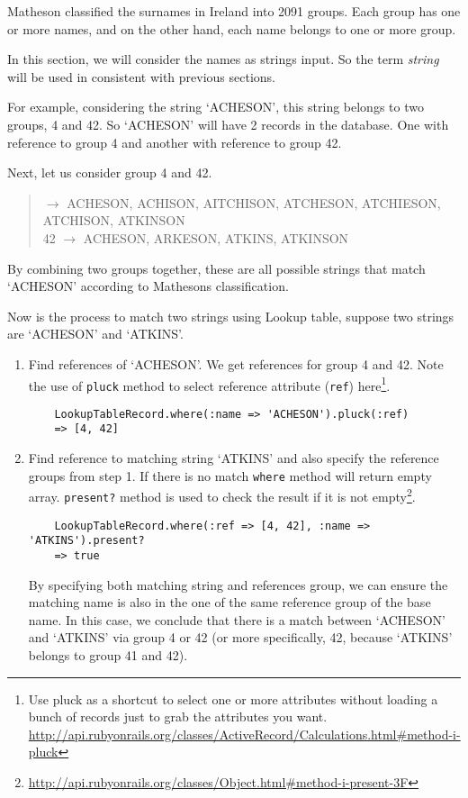 Matheson classified the surnames in Ireland into 2091 groups.
Each group has one or more names, and on the other hand,
each name belongs to one or more group.

In this section, we will consider the names as strings input.
So the term \emph{string} will be used in consistent with
previous sections.

For example, considering the string `ACHESON', this string
belongs to two groups, 4 and 42. So `ACHESON' will have
2 records in the database. One with reference to group 4
and another with reference to group 42.

Next, let us consider group 4 and 42.

\begin{quotation}  $\rightarrow$ ACHESON, ACHISON, AITCHISON, ATCHESON, ATCHIESON, ATCHISON, ATKINSON \\
42 $\rightarrow$ ACHESON, ARKESON, ATKINS, ATKINSON
\end{quotation}

By combining two groups together, these are all possible strings
that match `ACHESON' according to Matheson\textquotesingle s classification.

Now is the process to match two strings using Lookup table,
suppose two strings are `ACHESON' and `ATKINS'.

\begin{enumerate}
  \item Find references of `ACHESON'. We get references for group 4 and 42.
    Note the use of \texttt{pluck} method to select reference attribute (\texttt{ref})
    here\footnote{Use pluck as a shortcut to select one or more attributes
      without loading a bunch of records just to grab the attributes you want.
    \url{http://api.rubyonrails.org/classes/ActiveRecord/Calculations.html\#method-i-pluck}}.
    \begin{lstlisting}
    LookupTableRecord.where(:name => 'ACHESON').pluck(:ref)
    => [4, 42]
    \end{lstlisting}
  \item Find reference to matching string `ATKINS' and also specify
    the reference groups from step 1. If there is no match \texttt{where} method
    will return empty array. \texttt{present?} method is used to
    check the result if it is not empty\footnote{\url{http://api.rubyonrails.org/classes/Object.html\#method-i-present-3F}}.
    \begin{lstlisting}
    LookupTableRecord.where(:ref => [4, 42], :name => 'ATKINS').present?
    => true
    \end{lstlisting}
    By specifying both matching string and references group, we can ensure
    the matching name is also in the one of the same reference group
    of the base name. In this case, we conclude that there is a match
    between `ACHESON' and `ATKINS' via group 4 or 42
    (or more specifically, 42, because `ATKINS' belongs to group 41 and 42).
\end{enumerate}

